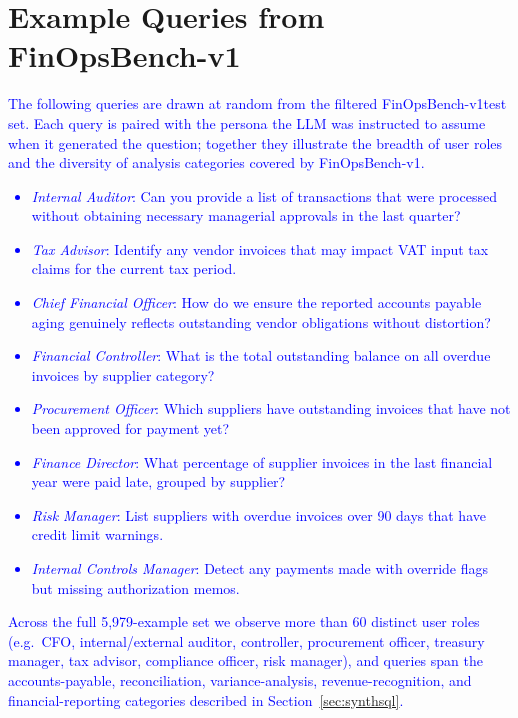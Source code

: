 \documentclass[11pt]{article}
\newcommand{\edit}[1]{\textcolor{blue}{#1}}
\newcommand{\synthsubset}{FinOpsBench-v1}\xspace
\begin{document}
\section{Example Queries from \synthsubset}
\label{app:example_queries}

\edit{The following queries are drawn at random from the filtered \synthsubset test set. Each query is paired with the persona the LLM was instructed to assume when it generated the question; together they illustrate the breadth of user roles and the diversity of analysis categories covered by \synthsubset.}

\edit{\begin{itemize}
    \item \edit{\emph{Internal Auditor}}: Can you provide a list of transactions that were processed without obtaining necessary managerial approvals in the last quarter?
    \item \edit{\emph{Tax Advisor}}: Identify any vendor invoices that may impact VAT input tax claims for the current tax period.
    \item \edit{\emph{Chief Financial Officer}}: How do we ensure the reported accounts payable aging genuinely reflects outstanding vendor obligations without distortion?
    \item \edit{\emph{Financial Controller}}: What is the total outstanding balance on all overdue invoices by supplier category?
    \item \edit{\emph{Procurement Officer}}: Which suppliers have outstanding invoices that have not been approved for payment yet?
    \item \edit{\emph{Finance Director}}: What percentage of supplier invoices in the last financial year were paid late, grouped by supplier?
    \item \edit{\emph{Risk Manager}}: List suppliers with overdue invoices over 90 days that have credit limit warnings.
    \item \edit{\emph{Internal Controls Manager}}: Detect any payments made with override flags but missing authorization memos.
\end{itemize}}

\edit{Across the full 5{,}979-example set we observe more than 60 distinct user roles (e.g.\ CFO, internal/external auditor, controller, procurement officer, treasury manager, tax advisor, compliance officer, risk manager), and queries span the accounts-payable, reconciliation, variance-analysis, revenue-recognition, and financial-reporting categories described in Section~\ref{sec:synthsql}.}
\end{document}
